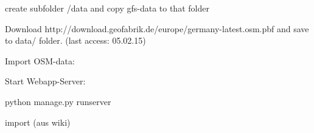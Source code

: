 \documentclass[11pt]{article}
\begin{document}
create subfolder /data and copy gfs-data to that folder


Download http://download.geofabrik.de/europe/germany-latest.osm.pbf and save to data/ folder. (last access: 05.02.15)

Import OSM-data:





Start Webapp-Server:

python manage.py runserver

import (aus wiki)
\end{document}
